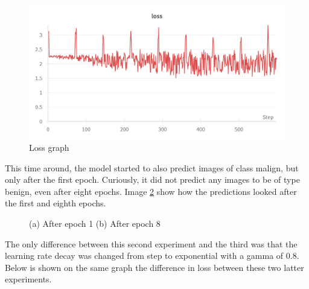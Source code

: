 \begin{figure}[ht!]
    \centering
    \includegraphics[width=1\textwidth]{figures/Figure11.png}
    \caption{Loss graph}
    \label{fig:fig10}
\end{figure}
This time around, the model started to also predict images of class malign, but only after the first epoch. Curiously, it did not predict any images to be of type benign, even after eight epochs. Image \ref{fig:fig11} show how the predictions looked after the first and eighth epochs.\\
\begin{figure}[ht!]
    \label{fig:fig11}
    \caption{(a) After epoch 1 (b) After epoch 8}
\end{figure}
The only difference between this second experiment and the third was that the learning rate decay was changed from step to exponential with a gamma of 0.8. Below is shown on the same graph the difference in loss between these two latter experiments.\\
